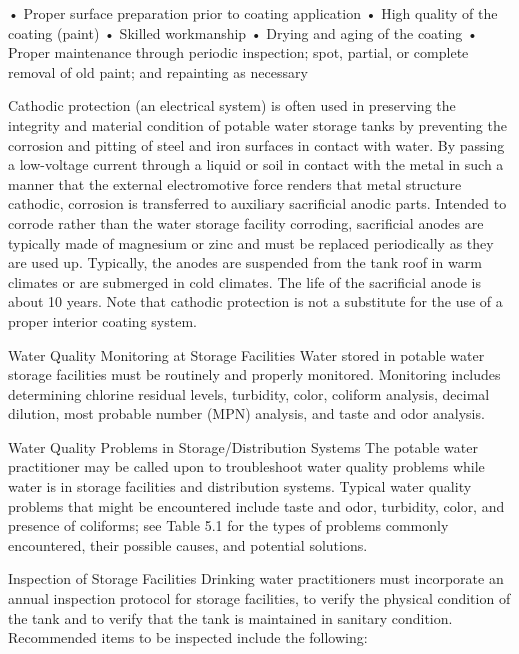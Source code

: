 \documentclass{article}
\begin{document}
• Proper surface preparation prior to coating application • High quality
of the coating (paint) • Skilled workmanship • Drying and aging of the
coating • Proper maintenance through periodic inspection; spot, partial,
or complete removal of old paint; and repainting as necessary

Cathodic protection (an electrical system) is often used in preserving
the integrity and material condition of potable water storage tanks by
preventing the corrosion and pitting of steel and iron surfaces in
contact with water. By passing a low-voltage current through a liquid or
soil in contact with the metal in such a manner that the external
electromotive force renders that metal structure cathodic, corrosion is
transferred to auxiliary sacrificial anodic parts. Intended to corrode
rather than the water storage facility corroding, sacrificial anodes are
typically made of magnesium or zinc and must be replaced periodically as
they are used up. Typically, the anodes are suspended from the tank roof
in warm climates or are submerged in cold climates. The life of the
sacrificial anode is about 10 years. Note that cathodic protection is
not a substitute for the use of a proper interior coating system.

Water Quality Monitoring at Storage Facilities Water stored in potable
water storage facilities must be routinely and properly monitored.
Monitoring includes determining chlorine residual levels, turbidity,
color, coliform analysis, decimal dilution, most probable number (MPN)
analysis, and taste and odor analysis.

Water Quality Problems in Storage/Distribution Systems The potable water
practitioner may be called upon to troubleshoot water quality problems
while water is in storage facilities and distribution systems. Typical
water quality problems that might be encountered include taste and odor,
turbidity, color, and presence of coliforms; see Table 5.1 for the types
of problems commonly encountered, their possible causes, and potential
solutions.

Inspection of Storage Facilities Drinking water practitioners must
incorporate an annual inspection protocol for storage facilities, to
verify the physical condition of the tank and to verify that the tank is
maintained in sanitary condition. Recommended items to be inspected
include the following:
\end{document}
